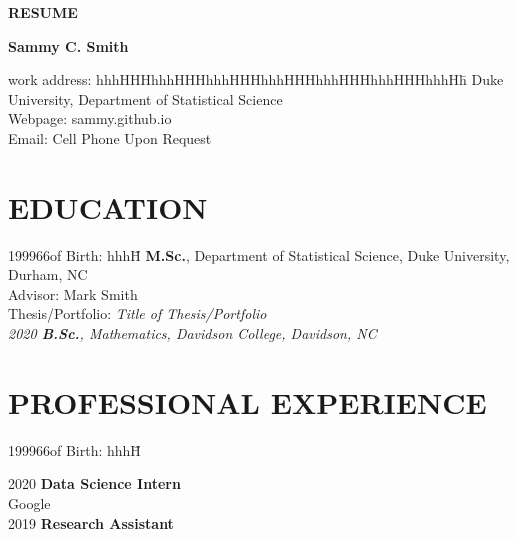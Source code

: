\documentclass[12pt,leqno]{article}
\begin{document}
\cfoot[]{}


\begin{center}
{\bf RESUME} \vspace*{.3cm}

{\bf Sammy C. Smith}
\end{center}
\begin{tabbing}
work address: hhhHHHhhhHHHhhhHHHhhhHHHhhhHHHhhhHHHhhhHh\=\kill
Duke University, Department of Statistical Science \\
Webpage: sammy.github.io\\
Email: 
Cell Phone Upon Request
\end{tabbing}


\section*{\normalsize EDUCATION}
\begin{tabbing}
199966of Birth: hhhH\=\> {\bf M.Sc.}, Department of Statistical Science, Duke University, Durham, NC \\ 
\> Advisor: Mark Smith\\
\> Thesis/Portfolio: \it{Title of Thesis/Portfolio}\\[.2cm]

2020\> {\bf B.Sc.}, Mathematics, Davidson College, Davidson, NC








\end{tabbing}

\section*{\normalsize PROFESSIONAL EXPERIENCE}
\begin{tabbing}
199966of Birth: hhhH\=\kill

2020\> \textbf{Data Science Intern} \\
\> Google  \\ [.2cm]

2019\> \textbf{Research Assistant} 
\end{tabbing}
\end{document}
